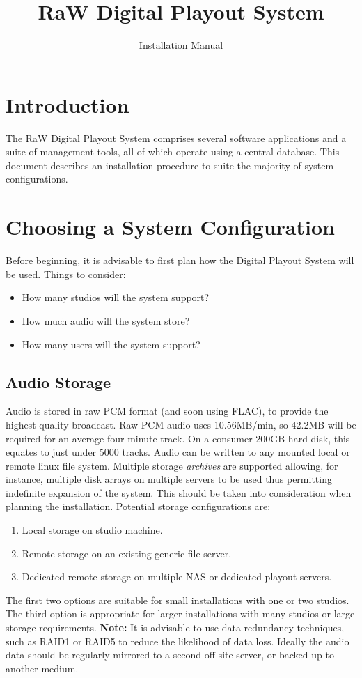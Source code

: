 \documentclass[a4paper,12pt]{report}
\numberwithin{equation}{section}
\begin{document}
\title{RaW Digital Playout System}
\author{Installation Manual}
\maketitle

\chapter{Introduction}
The RaW Digital Playout System comprises several software applications and a suite of management tools, all of which operate using a central database. This document describes an installation procedure to suite the majority of system configurations.

\chapter{Choosing a System Configuration}
Before beginning, it is advisable to first plan how the Digital Playout System will be used. Things to consider:
\begin{itemize}
\item How many studios will the system support?
\item How much audio will the system store?
\item How many users will the system support?
\end{itemize}

\section{Audio Storage}
Audio is stored in raw PCM format (and soon using FLAC), to provide the highest quality broadcast. Raw PCM audio uses 10.56MB/min, so 42.2MB will be required for an average four minute track. On a consumer 200GB hard disk, this equates to just under 5000 tracks. Audio can be written to any mounted local or remote linux file system. Multiple storage \emph{archives} are supported allowing, for instance, multiple disk arrays on multiple servers to be used thus permitting indefinite expansion of the system. This should be taken into consideration when planning the installation. Potential storage configurations are:
\begin{enumerate}
\item Local storage on studio machine.
\item Remote storage on an existing generic file server.
\item Dedicated remote storage on multiple NAS or dedicated playout servers.
\end{enumerate}
The first two options are suitable for small installations with one or two studios. The third option is appropriate for larger installations with many studios or large storage requirements.
\textbf{Note:} It is advisable to use data redundancy techniques, such as RAID1 or RAID5 to reduce the likelihood of data loss. Ideally the audio data should be regularly mirrored to a second off-site server, or backed up to another medium.
\end{document}
